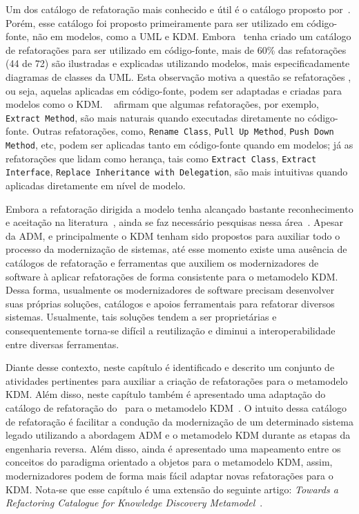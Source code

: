 Um dos catálogo de refatoração mais conhecido e útil é o catálogo proposto por~. Porém, esse catálogo foi proposto primeiramente para ser utilizado em código-fonte, não em modelos, como a UML e KDM. Embora~ tenha criado um catálogo de refatorações para ser utilizado em código-fonte, mais de 60\% das refatorações (44 de 72) são ilustradas e explicadas utilizando modelos, mais especificadamente diagramas de classes da UML. Esta observação motiva a questão se refatorações , ou seja, aquelas aplicadas em código-fonte, podem ser adaptadas e criadas para modelos como o KDM. ~ afirmam que algumas refatorações, por exemplo, \texttt{Extract Method}, são mais naturais quando executadas diretamente no código-fonte. Outras refatorações, como, \texttt{Rename Class}, \texttt{Pull Up Method}, \texttt{Push Down Method}, etc, podem ser aplicadas tanto em código-fonte quando em modelos; já as refatorações que lidam como herança, tais como \texttt{Extract Class}, \texttt{Extract Interface}, \texttt{Replace Inheritance with Delegation}, são mais intuitivas quando aplicadas diretamente em nível de modelo. 

Embora a refatoração dirigida a modelo tenha alcançado bastante reconhecimento e aceitação na literatura~\cite{Moghadam_2012,Maneerat_2011,Fourati_2011,Einarsson_2012,Steimann_2015,Akiyama_2011, Jensen_2010,Arendt_2012,Millan_2009,Tom_2008_2008}, ainda se faz necessário pesquisas nessa área~\cite{durelli_systematic_mapping, revisao_sistematica_uml_refactoring}.
Apesar da ADM, e principalmente o KDM tenham sido propostos para auxiliar todo o processo da modernização de sistemas, até esse momento existe uma ausência de catálogos de refatoração e ferramentas que auxiliem os modernizadores de software à aplicar refatorações de forma consistente para o metamodelo KDM. Dessa forma, usualmente os modernizadores de software precisam desenvolver suas próprias soluções, catálogos e apoios ferramentais para refatorar diversos sistemas. Usualmente, tais soluções tendem a ser proprietárias e consequentemente torna-se difícil a reutilização e diminui a interoperabilidade entre diversas ferramentas. 

Diante desse contexto, neste capítulo é identificado e descrito um conjunto de atividades pertinentes para auxiliar a criação de refatorações para o metamodelo KDM. Além disso, neste capítulo também é apresentado uma adaptação do catálogo de refatoração do~ para o metamodelo KDM~\cite{durelli_catalogo, durelli_VEM_ferramenta}. O intuito dessa catálogo de refatoração é facilitar a condução da modernização de um determinado sistema legado utilizando a abordagem ADM e o metamodelo KDM durante as etapas da engenharia reversa. Além disso, ainda é apresentado uma mapeamento entre os conceitos do paradigma orientado a objetos para o metamodelo KDM, assim, modernizadores podem de forma mais fácil adaptar novas refatorações para o KDM. Nota-se que esse capítulo é uma extensão do seguinte artigo: \textit{Towards a Refactoring Catalogue for Knowledge Discovery Metamodel}~\cite{durelli_catalogo}.

